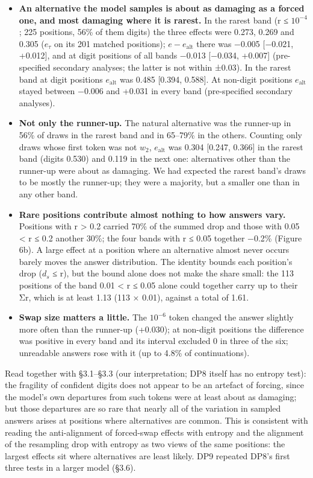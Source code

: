 \documentclass[
  10pt,
  a4paper,
]{article}
\providecommand{\tightlist}{%
  \setlength{\itemsep}{0pt}\setlength{\parskip}{0pt}}
\begin{document}
\begin{itemize}
\tightlist
\item
  \textbf{An alternative the model samples is about as damaging as a forced one, and most damaging where it is rarest.} In the rarest band (r ≤ \(10^{-4}\); 225 positions, 56\% of them digits) the
  three effects were 0.273, 0.269 and 0.305 (\(e_{\tau}\) on its 201 matched positions); \(e - e_{\mathrm{alt}}\) there was −0.005 {[}−0.021, +0.012{]}, and at digit positions of all bands −0.013
  {[}−0.034, +0.007{]} (pre-specified secondary analyses; the latter is not within ±0.03). In the rarest band at digit positions \(e_{\mathrm{alt}}\) was 0.485 {[}0.394, 0.588{]}. At non-digit
  positions \(e_{\mathrm{alt}}\) stayed between −0.006 and +0.031 in every band (pre-specified secondary analyses).
\item
  \textbf{Not only the runner-up.} The natural alternative was the runner-up in 56\% of draws in the rarest band and in 65--79\% in the others. Counting only draws whose first token was not \(w_2\),
  \(e_{\mathrm{alt}}\) was 0.304 {[}0.247, 0.366{]} in the rarest band (digits 0.530) and 0.119 in the next one: alternatives other than the runner-up were about as damaging. We had expected the
  rarest band's draws to be mostly the runner-up; they were a majority, but a smaller one than in any other band.
\item
  \textbf{Rare positions contribute almost nothing to how answers vary.} Positions with r \textgreater{} 0.2 carried 70\% of the summed drop and those with 0.05 \textless{} r ≤ 0.2 another 30\%; the
  four bands with r ≤ 0.05 together −0.2\% (Figure 6b). A large effect at a position where an alternative almost never occurs barely moves the answer distribution. The identity bounds each position's
  drop (\textbar{}\(d_{s}\)\textbar{} ≤ r), but the bound alone does not make the share small: the 113 positions of the band 0.01 \textless{} r ≤ 0.05 alone could together carry up to their Σr, which
  is at least 1.13 (113 × 0.01), against a total of 1.61.
\item
  \textbf{Swap size matters a little.} The \(10^{-6}\) token changed the answer slightly more often than the runner-up (+0.030); at non-digit positions the difference was positive in every band and
  its interval excluded 0 in three of the six; unreadable answers rose with it (up to 4.8\% of continuations).
\end{itemize}

Read together with §3.1--§3.3 (our interpretation; DP8 itself has no entropy test): the fragility of confident digits does not appear to be an artefact of forcing, since the model's own departures
from such tokens were at least about as damaging; but those departures are so rare that nearly all of the variation in sampled answers arises at positions where alternatives are common. This is
consistent with reading the anti-alignment of forced-swap effects with entropy and the alignment of the resampling drop with entropy as two views of the same positions: the largest effects sit where
alternatives are least likely. DP9 repeated DP8's first three tests in a larger model (§3.6).
\end{document}
